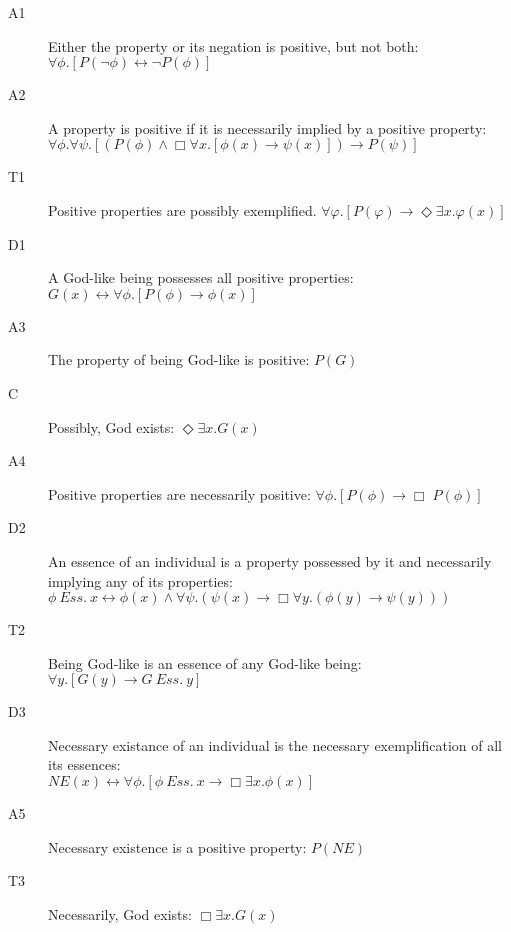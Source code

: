 \documentclass{llncs}
\newcommand{\imp}{\rightarrow}
\newcommand{\biimp}{\leftrightarrow}
\newcommand{\all}{\forall}
\newcommand{\ex}{\exists}
\newcommand{\nec}{\Box} %
\newcommand{\pos}{\Diamond} %
\newcommand{\ess}[2]{#1 \ \mathit{Ess.} \ #2}
\newcommand{\NE}{\mathit{NE}}
\begin{document}
\allowdisplaybreaks[1] 
\begin{description}
\item[A1] Either the property or its negation is positive, but not
  both:  \hfill 
  $\all \phi. [P(\neg \phi) \biimp \neg P(\phi)]$
\item[A2] A property is positive if it is necessarily implied by a
  positive property:  \\ \phantom{b} \hfill 
  $\all \phi. \all \psi.[(P(\phi) \wedge \nec \all x.[\phi(x)
  \imp \psi(x)]) \imp P(\psi)]$ 
\item[T1] Positive properties are possibly exemplified. \hfill $\all \varphi. [P(\varphi) \imp \pos \ex x.\varphi(x)]$
\item[D1] A God-like being possesses all positive properties: \hfill
  $G(x) \biimp \forall \phi. [P(\phi) \to \phi(x)]$
\item[A3]  The property of being God-like is positive: \hfill   $P(G)$
\item[C\phantom{1}] Possibly, God exists: \hfill $\pos \ex x. G(x)$
\item[A4]  Positive properties are necessarily positive: \hfill 
  $\all \phi.[P(\phi) \to \Box \; P(\phi)]$
\item[D2] An essence of an individual is a property possessed by it and necessarily implying any of its properties:\\
  \phantom{b} \hfill $\ess{\phi}{x} \biimp \phi(x) \wedge \all
  \psi. (\psi(x) \imp \nec \all y. (\phi(y) \imp \psi(y)))$
\item[T2]  Being God-like is an essence of any
  God-like being: \hfill $\all y.[G(y) \imp \ess{G}{y}]$ 
\item[D3] Necessary existance of an individual is the necessary exemplification of all its essences: \\
  \phantom{b} \hfill $\NE(x) \biimp \all \phi.[\ess{\phi}{x} \imp \nec \ex x.\phi(x)]$
\item[A5] Necessary existence is a positive property: \hfill $P(\NE)$
\item[T3] Necessarily, God exists: \hfill $\nec \ex x. G(x)$ 
\end{description}
\end{document}
